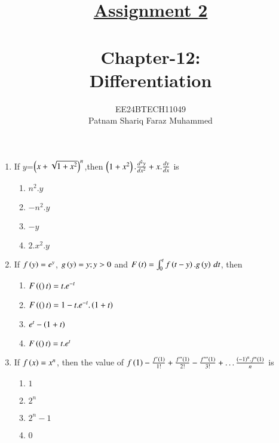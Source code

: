 \documentclass[journal,12pt,twocolumn]{IEEEtran}
\theoremstyle{remark}
\begin{document}


\title{{\uline{Assignment 2 \\ } \\}Chapter-12: \\Differentiation}
\author{{EE24BTECH11049 \\ Patnam Shariq Faraz Muhammed}}

\maketitle
\newpage
\bigskip

\begin{enumerate}

	\item
	{If $y$=$\left(x+\sqrt{1+x^{2}}\right)^{n}$,then $\left(1+x^{2}\right).\frac{d^{2}y}{dx^{2}} + x.\frac{dy}{dx}$ is}

	\hfill{}

	\begin{enumerate}[label=(\alph*)]
		\item $n^{2}.y$
		\item $-n^{2}.y$
		\item $-y$
		\item $2.x^{2}.y$
	\end{enumerate}

	\item
	If $f\left(y\right)=e^{y}$, $g\left(y\right)=y; y>0$ and $F\left(t\right)= \int_{0}^{t}{f\left(t-y\right).g\left(y\right) \, dt}$, then

	\hfill{}

	\begin{enumerate}[label=(\alph*)]
		\item $F\left((\right)t)=t.e^{-t}$
		\item $F\left((\right)t)=1-t.e^{-t}.\left(1+t\right)$
		\item $e^{t}-\left(1+t\right)$
		\item $F\left((\right)t)=t.e^{t}$
	\end{enumerate}

	\item 
		If $f\left(x\right)=x^{n}$, then the value of $f\left(1\right)-\frac{f'\left(1\right)}{1!}+\frac{{f''\left(1\right)}}{2!}-\frac{{f'''\left(1\right)}}{3!}+\dots \frac{\left(-1\right)^n.f^{n}\left(1\right)}{n}$ is

	\hfill{}
	
	\begin{enumerate}[label=(\alph*)]
		\item $1$
		\item $2^{n}$
		\item $2^{n}-1$
		\item $0$
	\end{enumerate}
	
\end{enumerate}
\end{document}
